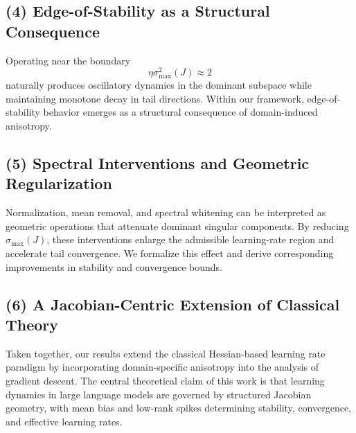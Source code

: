 \documentclass{article}
\begin{document}
\subsection*{(4) Edge-of-Stability as a Structural Consequence}

Operating near the boundary
\begin{equation}
\eta \sigma_{\max}^2(J) \approx 2
\end{equation}
naturally produces oscillatory dynamics in the dominant subspace while
maintaining monotone decay in tail directions.
Within our framework, edge-of-stability behavior emerges as a structural
consequence of domain-induced anisotropy.

\subsection*{(5) Spectral Interventions and Geometric Regularization}

Normalization, mean removal, and spectral whitening can be interpreted
as geometric operations that attenuate dominant singular components.
By reducing $\sigma_{\max}(J)$, these interventions enlarge the admissible
learning-rate region and accelerate tail convergence.
We formalize this effect and derive corresponding improvements in
stability and convergence bounds.

\subsection*{(6) A Jacobian-Centric Extension of Classical Theory}

Taken together, our results extend the classical Hessian-based learning
rate paradigm by incorporating domain-specific anisotropy into the
analysis of gradient descent.
The central theoretical claim of this work is that learning dynamics
in large language models are governed by structured Jacobian geometry,
with mean bias and low-rank spikes determining stability, convergence,
and effective learning rates.

\newpage





\newpage

\appendix


%


%
\end{document}
